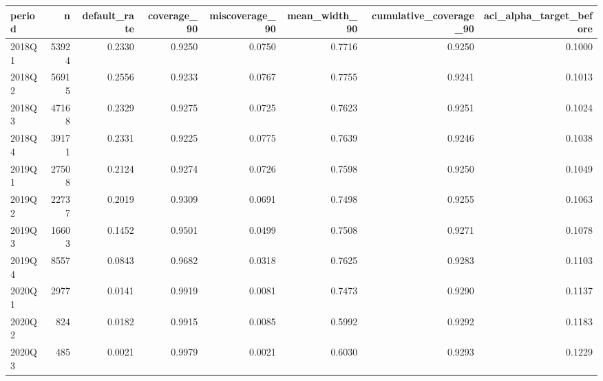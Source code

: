 \begin{tabular}{lrrrrrrr}
\toprule
period & n & default\_rate & coverage\_90 & miscoverage\_90 & mean\_width\_90 & cumulative\_coverage\_90 & aci\_alpha\_target\_before \\
\midrule
2018Q1 & 53924 & 0.2330 & 0.9250 & 0.0750 & 0.7716 & 0.9250 & 0.1000 \\
2018Q2 & 56915 & 0.2556 & 0.9233 & 0.0767 & 0.7755 & 0.9241 & 0.1013 \\
2018Q3 & 47168 & 0.2329 & 0.9275 & 0.0725 & 0.7623 & 0.9251 & 0.1024 \\
2018Q4 & 39171 & 0.2331 & 0.9225 & 0.0775 & 0.7639 & 0.9246 & 0.1038 \\
2019Q1 & 27508 & 0.2124 & 0.9274 & 0.0726 & 0.7598 & 0.9250 & 0.1049 \\
2019Q2 & 22737 & 0.2019 & 0.9309 & 0.0691 & 0.7498 & 0.9255 & 0.1063 \\
2019Q3 & 16603 & 0.1452 & 0.9501 & 0.0499 & 0.7508 & 0.9271 & 0.1078 \\
2019Q4 & 8557 & 0.0843 & 0.9682 & 0.0318 & 0.7625 & 0.9283 & 0.1103 \\
2020Q1 & 2977 & 0.0141 & 0.9919 & 0.0081 & 0.7473 & 0.9290 & 0.1137 \\
2020Q2 & 824 & 0.0182 & 0.9915 & 0.0085 & 0.5992 & 0.9292 & 0.1183 \\
2020Q3 & 485 & 0.0021 & 0.9979 & 0.0021 & 0.6030 & 0.9293 & 0.1229 \\
\bottomrule
\end{tabular}
